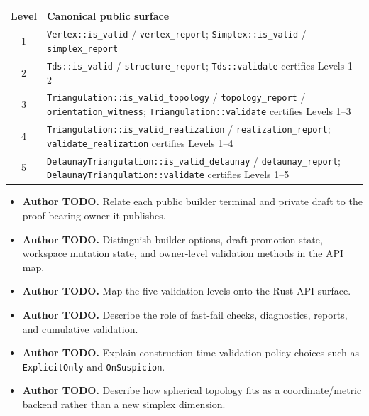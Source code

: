 \documentclass[manuscript,nonacm]{acmart}
\newcommand{\AuthorTodo}[1]{\textbf{Author TODO.} #1}
\begin{document}
\begin{center}
  \begin{minipage}{\textwidth}
    \label{tab:validation-api}
    \small
    \begin{tabular}{@{}cp{}@{}}
      \toprule
      Level & Canonical public surface \\
      \midrule
      1 & \texttt{Vertex::is\_valid} / \texttt{vertex\_report};
      \texttt{Simplex::is\_valid} / \texttt{simplex\_report} \\
      2 & \texttt{Tds::is\_valid} / \texttt{structure\_report};
      \texttt{Tds::validate} certifies Levels 1--2 \\
      3 & \texttt{Triangulation::is\_valid\_topology} /
      \texttt{topology\_report} / \texttt{orientation\_witness};
      \texttt{Triangulation::validate} certifies Levels 1--3 \\
      4 & \texttt{Triangulation::is\_valid\_realization} /
      \texttt{realization\_report}; \texttt{validate\_realization} certifies
      Levels 1--4 \\
      5 & \texttt{DelaunayTriangulation::is\_valid\_delaunay} /
      \texttt{delaunay\_report}; \texttt{DelaunayTriangulation::validate}
      certifies Levels 1--5 \\
      \bottomrule
    \end{tabular}
  \end{minipage}
\end{center}

\begin{itemize}
  \item \AuthorTodo{Relate each public builder terminal and private draft to
    the proof-bearing owner it publishes.}
  \item \AuthorTodo{Distinguish builder options, draft promotion state,
      workspace mutation state, and owner-level validation methods in the API
    map.}
  \item \AuthorTodo{Map the five validation levels onto the Rust API surface.}
  \item \AuthorTodo{Describe the role of fast-fail checks, diagnostics,
    reports, and cumulative validation.}
  \item \AuthorTodo{Explain construction-time validation policy choices such
    as \texttt{ExplicitOnly} and \texttt{OnSuspicion}.}
  \item \AuthorTodo{Describe how spherical topology fits as a
    coordinate/metric backend rather than a new simplex dimension.}
\end{itemize}
\end{document}
